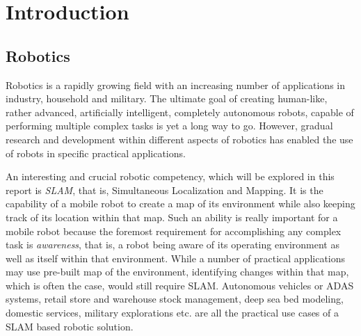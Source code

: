 \documentclass{article}
\begin{document}
\pagebreak

\tableofcontents

\pagebreak

\section{Introduction}

\subsection{Robotics}
Robotics is a rapidly growing field with an increasing number of applications in industry, household and military. The ultimate goal of creating human-like, rather advanced, artificially intelligent, completely autonomous robots, capable of performing multiple complex tasks is yet a long way to go. However, gradual research and development within different aspects of robotics has enabled the use of robots in specific practical applications. 

An interesting and crucial robotic competency, which will be explored in this report is \emph{SLAM}, that is, Simultaneous Localization and Mapping. It is the capability of a mobile robot to create a map of its environment while also keeping track of its location within that map. Such an ability is really important for a mobile robot because the foremost requirement for accomplishing any complex task is \emph{awareness}, that is, a robot being aware of its operating environment as well as itself within that environment. While a number of practical applications may use pre-built map of the environment, identifying changes within that map, which is often the case, would still require SLAM. Autonomous vehicles or ADAS systems, retail store and warehouse stock management, deep sea bed modeling, domestic services, military explorations etc. are all the practical use cases of a SLAM based robotic solution.
\end{document}
